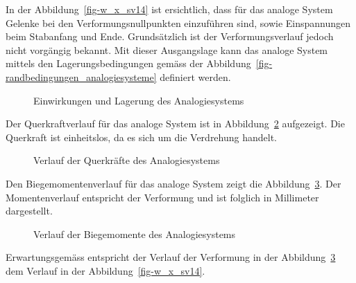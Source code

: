 \documentclass[
  12pt,
  letterpaper,
  egregdoesnotlikesansseriftitles]{scrreprt}
\begin{document}
In der Abbildung~\ref{fig-w_x_sv14} ist ersichtlich, dass für das
analoge System Gelenke bei den Verformungsnullpunkten einzuführen sind,
sowie Einspannungen beim Stabanfang und Ende. Grundsätzlich ist der
Verformungsverlauf jedoch nicht vorgängig bekannt. Mit dieser
Ausgangslage kann das analoge System mittels den Lagerungsbedingungen
gemäss der Abbildung~\ref{fig-randbedingungen_analogiesysteme} definiert
werden.

\begin{figure}[H]


\caption{\label{fig-analogiesystem_sv14}Einwirkungen und Lagerung des
Analogiesystems}

\end{figure}%

Der Querkraftverlauf für das analoge System ist in
Abbildung~\ref{fig-v_x_mohr_sv14} aufgezeigt. Die Querkraft ist
einheitslos, da es sich um die Verdrehung handelt.

\begin{figure}[H]


\caption{\label{fig-v_x_mohr_sv14}Verlauf der Querkräfte des
Analogiesystems}

\end{figure}%

Den Biegemomentenverlauf für das analoge System zeigt die
Abbildung~\ref{fig-m_x_mohr_sv14}. Der Momentenverlauf entspricht der
Verformung und ist folglich in Millimeter dargestellt.

\begin{figure}[H]


\caption{\label{fig-m_x_mohr_sv14}Verlauf der Biegemomente des
Analogiesystems}

\end{figure}%

Erwartungsgemäss entspricht der Verlauf der Verformung in der
Abbildung~\ref{fig-m_x_mohr_sv14} dem Verlauf in der
Abbildung~\ref{fig-w_x_sv14}.
\end{document}
